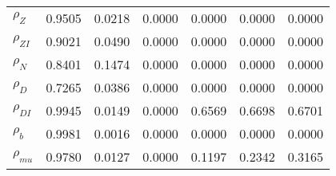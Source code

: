 \begin{center}
\begin{longtable}{lcccccc}
$ {\rho_Z}             $	 & 	          0.9505	 & 	          0.0218	 & 	          0.0000	 & 	          0.0000	 & 	          0.0000	 & 	          0.0000 \\ 
$ {\rho_{ZI}}          $	 & 	          0.9021	 & 	          0.0490	 & 	          0.0000	 & 	          0.0000	 & 	          0.0000	 & 	          0.0000 \\ 
$ {\rho_N}             $	 & 	          0.8401	 & 	          0.1474	 & 	          0.0000	 & 	          0.0000	 & 	          0.0000	 & 	          0.0000 \\ 
$ {\rho_D}             $	 & 	          0.7265	 & 	          0.0386	 & 	          0.0000	 & 	          0.0000	 & 	          0.0000	 & 	          0.0000 \\ 
$ {\rho_{DI}}          $	 & 	          0.9945	 & 	          0.0149	 & 	          0.0000	 & 	          0.6569	 & 	          0.6698	 & 	          0.6701 \\ 
$ {\rho_b}             $	 & 	          0.9981	 & 	          0.0016	 & 	          0.0000	 & 	          0.0000	 & 	          0.0000	 & 	          0.0000 \\ 
$ {\rho_{mu}}          $	 & 	          0.9780	 & 	          0.0127	 & 	          0.0000	 & 	          0.1197	 & 	          0.2342	 & 	          0.3165 \\ 
\end{longtable}
 \end{center}
